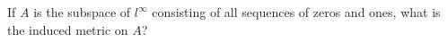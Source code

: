If $A$ is the subspace of $l^{\infty}$ consisting of all sequences of zeros and ones, what is the
induced metric on $A$?\\